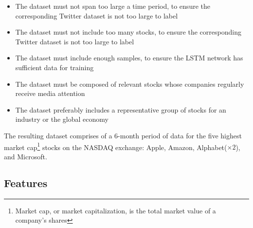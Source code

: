 \documentclass[12pt,a4paper,twoside,openright]{report}
\begin{document}
\begin{itemize}
\item
The dataset must not span too large a time period, to ensure the corresponding Twitter dataset is not too large to label

\item
The dataset must not include too many stocks, to ensure the corresponding Twitter dataset is not too large to label

\item
The dataset must include enough samples, to ensure the LSTM network has sufficient data for training

\item
The dataset must be composed of relevant stocks whose companies regularly receive media attention

\item
The dataset preferably includes a representative group of stocks for an industry or the global economy

\end{itemize}

The resulting dataset comprises of a 6-month period of data for the five highest market cap\footnote{Market cap, 
or market capitalization, is the total market value of a company's shares} stocks on the
NASDAQ exchange: Apple, Amazon, Alphabet\footnotemark ($\times2$), and Microsoft.



\subsection{Features}
\label{sec:impFinFeat}

\end{document}
